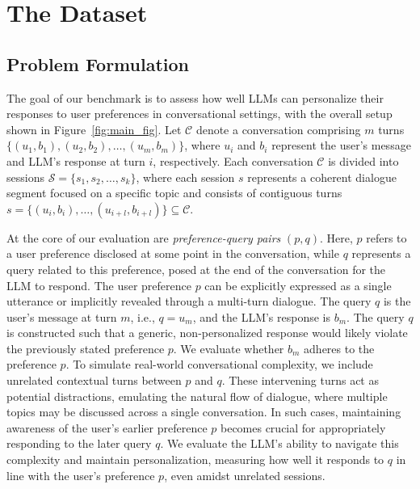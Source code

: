 



\section{The \ours{} Dataset}

\subsection{Problem Formulation}
\label{sec:formulation}
The goal of our benchmark is to assess how well LLMs can personalize their responses to user preferences in conversational settings, with the overall setup shown in Figure~\ref{fig:main_fig}. Let $\mathcal{C}$ denote a conversation comprising $m$ turns $\{(u_1, b_1), (u_2, b_2), \ldots, (u_m, b_m)\}$, where $u_i$ and $b_i$ represent the user's message and LLM's response at turn $i$, respectively. Each conversation $\mathcal{C}$ is divided into sessions $\mathcal{S} = \{s_1, s_2, \ldots, s_k\}$, where each session $s$ represents a coherent dialogue segment focused on a specific topic and consists of contiguous turns $s = \{(u_i, b_i), \ldots, (u_{i+l}, b_{i+l})\} \subseteq \mathcal{C}$. 

At the core of our evaluation are \textit{preference-query pairs} $(p, q)$. Here, $p$ refers to a user preference disclosed at some point in the conversation, while $q$ represents a query related to this preference, posed at the end of the conversation for the LLM to respond. The user preference $p$ can be explicitly expressed as a single utterance or implicitly revealed through a multi-turn dialogue. The query $q$ is the user's message at turn $m$, i.e., $q = u_m$, and the LLM's response is $b_m$. The query $q$ is constructed such that a generic, non-personalized response would likely violate the previously stated preference $p$. We evaluate whether $b_m$ adheres to the preference $p$. To simulate real-world conversational complexity, we include unrelated contextual turns between $p$ and $q$. These intervening turns act as potential distractions, emulating the natural flow of dialogue, where multiple topics may be discussed across a single conversation. In such cases, maintaining awareness of the user’s earlier preference $p$ becomes crucial for appropriately responding to the later query $q$. We evaluate the LLM's ability to navigate this complexity and maintain personalization, measuring how well it responds to $q$ in line with the user’s preference $p$, even amidst unrelated sessions. 



